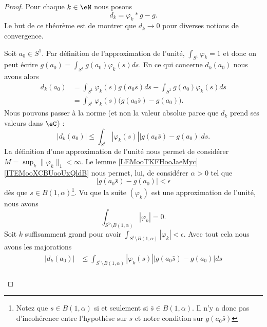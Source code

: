 \begin{proof}
	Pour chaque \( k\in \eN\) nous posons
	\begin{equation}
		d_k=\varphi_k*g-g.
	\end{equation}
	Le but de ce théorème est de montrer que \( d_k\to 0\) pour diverses notions de convergence.
	\begin{subproof}
		Soit \( a_0\in S^1\). Par définition de l'approximation de l'unité, \( \int_{S^1}\varphi_k=1\) et donc on peut écrire \( g(a_0)=\int_{S^1}g(a_0)\varphi_k(s)ds\). En ce qui concerne \( d_k(a_0)\) nous avons alors
		\begin{subequations}
			\begin{align}
				d_k(a_0) & =\int_{S^1}\varphi_k(s)g(a_0\bar s)ds-\int_{S^1}g(a_0)\varphi_k(s)ds \\
				         & =\int_{S^1}\varphi_k(s)\big( g(a_0\bar s)-g(a_0) \big).
			\end{align}
		\end{subequations}
		Nous pouvons passer à la norme (et non la valeur absolue parce que \( d_k\) prend ses valeurs dans \( \eC\)) :
		\begin{equation}
			| d_k(a_0) |\leq \int_{S^1}| \varphi_k(s) |\big| g(a_0\bar s)-g(a_0) \big|ds.
		\end{equation}
		La définition d'une approximation de l'unité nous permet de considérer \( M=\sup_k\| \varphi_k \|_1<\infty\). Le lemme \ref{LEMooTKFHooJaeMyc}\ref{ITEMooXCBUooUxQldB} nous permet, lui, de considérer \( \alpha>0\) tel que
		\begin{equation}
			| g(a_0\bar s)-g(a_0) |<\epsilon
		\end{equation}
		dès que \( s\in B(1,\alpha)\)\footnote{Notez que \( s\in B(1,\alpha)\) si et seulement si \( \bar s\in B(1,\alpha)\). Il n'y a donc pas d'incohérence entre l'hypothèse sur \( s\) et notre condition sur \( g(a_0\bar s)\)}. Vu que la suite \( (\varphi_k)\) est une approximation de l'unité, nous avons
		\begin{equation}
			\int_{S^1\setminus B(1,\alpha)}| \varphi_k |=0.
		\end{equation}
		Soit \( k\) suffisamment grand pour avoir \( \int_{S^1\setminus B(1,\alpha)}| \varphi_k |<\epsilon\). Avec tout cela nous avons les majorations
		\begin{subequations}
			\begin{align}
				| d_k(a_0) | & \leq \int_{S^1\setminus B(1,\alpha)}| \varphi_k(s) |\big| g(a_0\bar s)-g(a_0) \big|ds                                                                                                                                \\

\end{align}
\end{subequations}
\end{subproof}
\end{proof}
